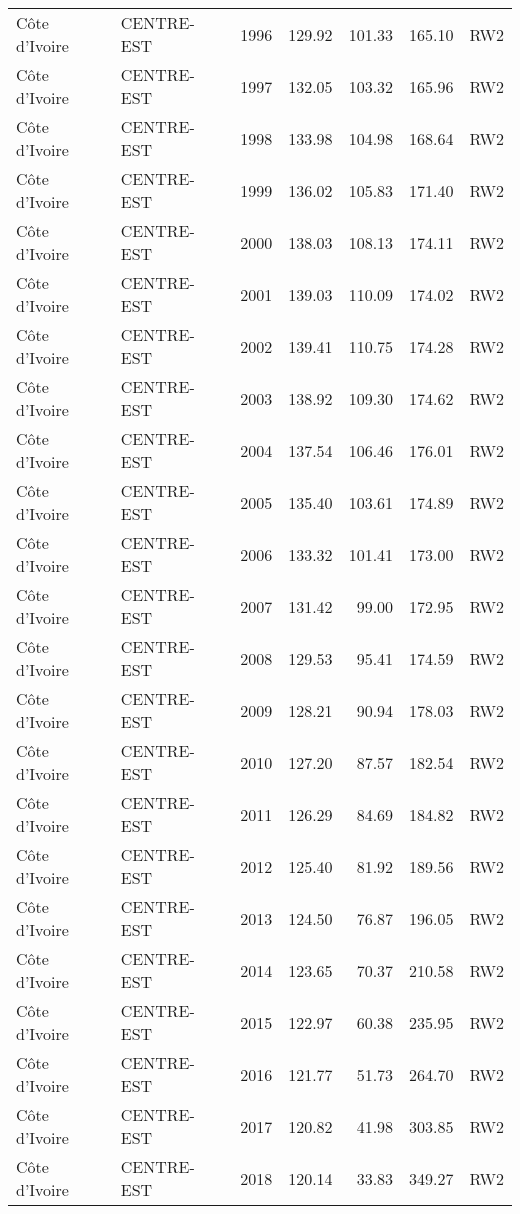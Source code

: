 \begin{longtable}{lllrrrl}
  C\^{o}te d'Ivoire & CENTRE-EST & 1996 & 129.92 & 101.33 & 165.10 & RW2 \\ 
  C\^{o}te d'Ivoire & CENTRE-EST & 1997 & 132.05 & 103.32 & 165.96 & RW2 \\ 
  C\^{o}te d'Ivoire & CENTRE-EST & 1998 & 133.98 & 104.98 & 168.64 & RW2 \\ 
  C\^{o}te d'Ivoire & CENTRE-EST & 1999 & 136.02 & 105.83 & 171.40 & RW2 \\ 
  C\^{o}te d'Ivoire & CENTRE-EST & 2000 & 138.03 & 108.13 & 174.11 & RW2 \\ 
  C\^{o}te d'Ivoire & CENTRE-EST & 2001 & 139.03 & 110.09 & 174.02 & RW2 \\ 
  C\^{o}te d'Ivoire & CENTRE-EST & 2002 & 139.41 & 110.75 & 174.28 & RW2 \\ 
  C\^{o}te d'Ivoire & CENTRE-EST & 2003 & 138.92 & 109.30 & 174.62 & RW2 \\ 
  C\^{o}te d'Ivoire & CENTRE-EST & 2004 & 137.54 & 106.46 & 176.01 & RW2 \\ 
  C\^{o}te d'Ivoire & CENTRE-EST & 2005 & 135.40 & 103.61 & 174.89 & RW2 \\ 
  C\^{o}te d'Ivoire & CENTRE-EST & 2006 & 133.32 & 101.41 & 173.00 & RW2 \\ 
  C\^{o}te d'Ivoire & CENTRE-EST & 2007 & 131.42 & 99.00 & 172.95 & RW2 \\ 
  C\^{o}te d'Ivoire & CENTRE-EST & 2008 & 129.53 & 95.41 & 174.59 & RW2 \\ 
  C\^{o}te d'Ivoire & CENTRE-EST & 2009 & 128.21 & 90.94 & 178.03 & RW2 \\ 
  C\^{o}te d'Ivoire & CENTRE-EST & 2010 & 127.20 & 87.57 & 182.54 & RW2 \\ 
  C\^{o}te d'Ivoire & CENTRE-EST & 2011 & 126.29 & 84.69 & 184.82 & RW2 \\ 
  C\^{o}te d'Ivoire & CENTRE-EST & 2012 & 125.40 & 81.92 & 189.56 & RW2 \\ 
  C\^{o}te d'Ivoire & CENTRE-EST & 2013 & 124.50 & 76.87 & 196.05 & RW2 \\ 
  C\^{o}te d'Ivoire & CENTRE-EST & 2014 & 123.65 & 70.37 & 210.58 & RW2 \\ 
  C\^{o}te d'Ivoire & CENTRE-EST & 2015 & 122.97 & 60.38 & 235.95 & RW2 \\ 
  C\^{o}te d'Ivoire & CENTRE-EST & 2016 & 121.77 & 51.73 & 264.70 & RW2 \\ 
  C\^{o}te d'Ivoire & CENTRE-EST & 2017 & 120.82 & 41.98 & 303.85 & RW2 \\ 
  C\^{o}te d'Ivoire & CENTRE-EST & 2018 & 120.14 & 33.83 & 349.27 & RW2 \\ 

\end{longtable}
